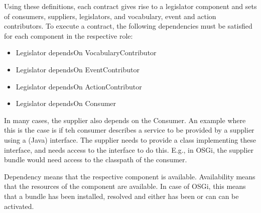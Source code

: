 \documentclass{llncs}
\begin{document}



Using these definitions, each contract gives rise to a legislator component and sets of consumers, suppliers, legislators, and vocabulary, event and action contributors. To execute a contract, the following dependencies must be satisfied for each component in the respective role: 

\begin{itemize}
\item Legislator dependsOn VocabularyContributor
\item Legislator dependsOn EventContributor
\item Legislator dependsOn ActionContributor
\item Legislator dependsOn Consumer
\end{itemize}

In many cases, the supplier also depends on the Consumer. An example where this is the case is if teh consumer describes a service to be provided by a supplier using a (Java) interface. The supplier needs to provide a class implementing these interface, and needs access to the interface to do this. E.g., in OSGi, the supplier bundle would need access to the classpath of the consumer. 

Dependency means that the respective component is available. Availability means that the resources of the component are available. In case of OSGi, this means that a bundle has been installed, resolved and either has been or can can be activated. 
\end{document}
